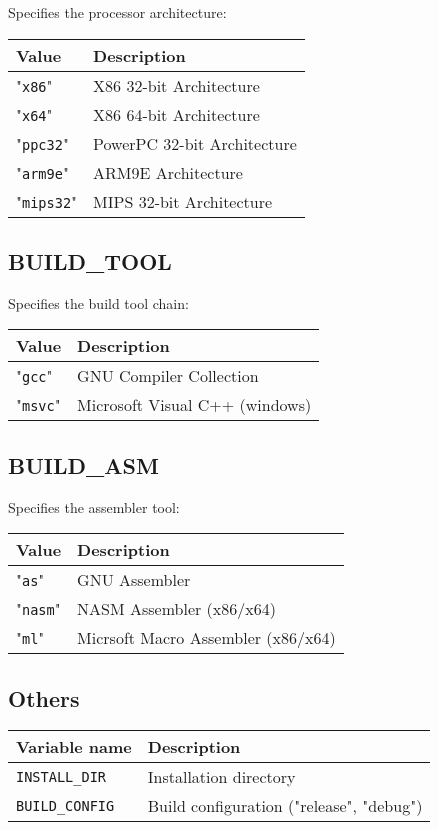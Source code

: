 \documentclass{article}
\newcommand{\var}[1]{{\tt #1}}
\newcommand{\val}[1]{"{\tt #1}"}
\begin{document}
Specifies the processor architecture:

\begin{tabular}{ll}
Value        & Description                 \\
\hline
\val{x86}    & X86 32-bit Architecture     \\
\val{x64}    & X86 64-bit Architecture     \\
\val{ppc32}  & PowerPC 32-bit Architecture \\
\val{arm9e}  & ARM9E Architecture          \\
\val{mips32} & MIPS 32-bit Architecture    \\
\end{tabular}

\subsection{BUILD\_TOOL}

Specifies the build tool chain:

\begin{tabular}{ll}
Value      & Description             \\
\hline
\val{gcc}  & GNU Compiler Collection \\
\val{msvc} & Microsoft Visual C++ (windows) \\
\end{tabular}

\subsection{BUILD\_ASM}

Specifies the assembler tool:

\begin{tabular}{ll}
Value      & Description              \\
\hline
\val{as}   & GNU Assembler            \\
\val{nasm} & NASM Assembler (x86/x64) \\
\val{ml}   & Micrsoft Macro Assembler (x86/x64)\\
\end{tabular}

\subsection{Others}

\begin{tabular}{ll}
Variable name		& Description		\\
\hline
\var{INSTALL\_DIR}	& Installation directory \\
\var{BUILD\_CONFIG}	& Build configuration ("release", "debug") \\
\end{tabular}
\end{document}
